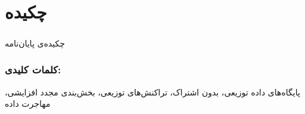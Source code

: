 
\chapter*{چکیده}

\paragraph*{}
چکیده‌ی پایان‌نامه

\subsection*{کلمات کلیدی:}
پایگاه‌های داده توزیعی، بدون اشتراک، تراکنش‌های توزیعی، بخش‌بندی مجدد افزایشی، مهاجرت داده

